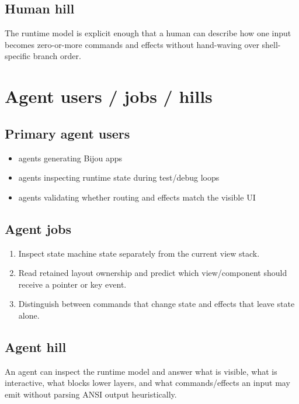 \subsection{Human hill}\label{record-149-human-hill}

The runtime model is explicit enough that a human can describe how one input becomes zero-or-more commands and effects without hand-waving over shell-specific branch order.

\section{Agent users / jobs / hills}\label{record-149-agent-users-jobs-hills}

\subsection{Primary agent users}\label{record-149-primary-agent-users}

\begin{itemize}
\tightlist
\item
  agents generating Bijou apps
\item
  agents inspecting runtime state during test/debug loops
\item
  agents validating whether routing and effects match the visible UI
\end{itemize}

\subsection{Agent jobs}\label{record-149-agent-jobs}

\begin{enumerate}
\def\labelenumi{\arabic{enumi}.}
\tightlist
\item
  Inspect state machine state separately from the current view stack.
\item
  Read retained layout ownership and predict which view/component should receive a pointer or key event.
\item
  Distinguish between commands that change state and effects that leave state alone.
\end{enumerate}

\subsection{Agent hill}\label{record-149-agent-hill}

An agent can inspect the runtime model and answer what is visible, what is interactive, what blocks lower layers, and what commands/effects an input may emit without parsing ANSI output heuristically.

